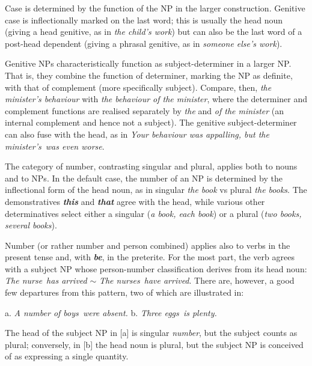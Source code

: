 Case is determined by the function of the NP in the larger construction. Genitive case is inflectionally marked on the last word; this is usually the head noun (giving a {head genitive}, as in \textit{the child's work}) but can also be the last word of a post-head dependent (giving a {phrasal genitive}, as in \textit{someone else's work}).

Genitive NPs characteristically function as {subject-determiner} in a larger NP. That is, they combine the function of determiner, marking the NP as definite, with that of complement (more specifically subject). Compare, then, \textit{the minister's behaviour} with \textit{the behaviour of the minister}, where the determiner and complement functions are realised separately by \textit{the} and \textit{of the minister} (an internal complement and hence not a subject). The genitive subject-determiner can also fuse with the head, as in \textit{Your behaviour was appalling, but \ob the minister's\cb\ was even worse}.

The category of {number}, contrasting singular and plural, applies both to nouns and to NPs. In the default case, the number of an NP is determined by the inflectional form of the head noun, as in singular \textit{the book} vs plural \textit{the books}. The demonstratives \textit{\textbf{this}} and \textit{\textbf{that}} agree with the head, while various other determinatives select either a singular (\textit{a book, each book}) or a plural (\textit{two books, several books}). 

Number (or rather number and person combined) applies also to verbs in the present tense and, with \textit{\textbf{be}}, in the preterite. For the most part, the verb agrees with a subject NP whose person-number classification derives from its head noun: \ob\textit{The nurse}\cb\ \textit{has arrived} $\sim$ \ob\textit{The nurses}\cb\ \textit{have arrived}. There are, however, a good few departures from this pattern, two of which are illustrated in:

\begin{examples}
\item \label{ex:25}
    a. \ob \textit{A number of boys\cb\ were absent.}\hspace{3em}
    b. \textit{\ob Three eggs\cb\ is plenty.}
\end{examples}
The head of the subject NP in [a] is singular \textit{number}, but the subject counts as plural; conversely, in [b] the head noun is plural, but the subject NP is conceived of as expressing a single quantity.

